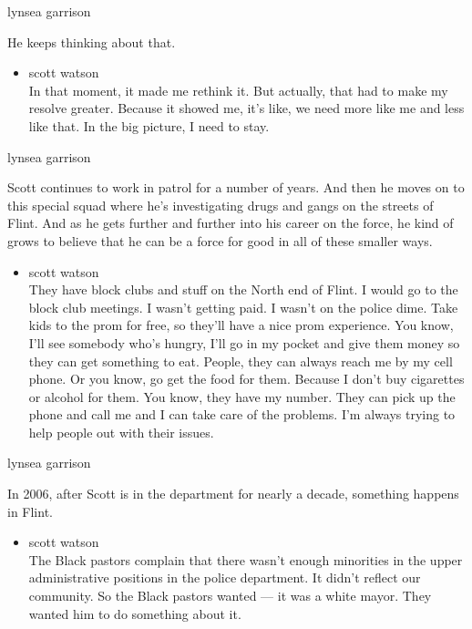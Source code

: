 lynsea garrison

He keeps thinking about that.

\begin{itemize}
\tightlist
\item
  scott watson\\
  In that moment, it made me rethink it. But actually, that had to make
  my resolve greater. Because it showed me, it's like, we need more like
  me and less like that. In the big picture, I need to stay.
\end{itemize}

lynsea garrison

Scott continues to work in patrol for a number of years. And then he
moves on to this special squad where he's investigating drugs and gangs
on the streets of Flint. And as he gets further and further into his
career on the force, he kind of grows to believe that he can be a force
for good in all of these smaller ways.

\begin{itemize}
\tightlist
\item
  scott watson\\
  They have block clubs and stuff on the North end of Flint. I would go
  to the block club meetings. I wasn't getting paid. I wasn't on the
  police dime. Take kids to the prom for free, so they'll have a nice
  prom experience. You know, I'll see somebody who's hungry, I'll go in
  my pocket and give them money so they can get something to eat.
  People, they can always reach me by my cell phone. Or you know, go get
  the food for them. Because I don't buy cigarettes or alcohol for them.
  You know, they have my number. They can pick up the phone and call me
  and I can take care of the problems. I'm always trying to help people
  out with their issues.
\end{itemize}

lynsea garrison

In 2006, after Scott is in the department for nearly a decade, something
happens in Flint.

\begin{itemize}
\tightlist
\item
  scott watson\\
  The Black pastors complain that there wasn't enough minorities in the
  upper administrative positions in the police department. It didn't
  reflect our community. So the Black pastors wanted --- it was a white
  mayor. They wanted him to do something about it.
\end{itemize}

